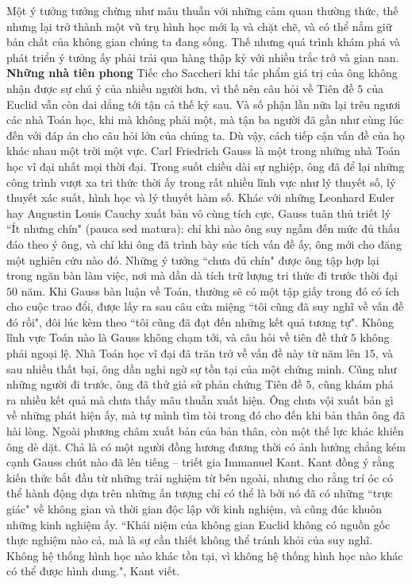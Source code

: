 \begin{multicols}{2}
	Một ý tưởng tưởng chừng như mâu thuẫn với những cảm quan thường thức, thế nhưng lại trở thành một vũ trụ hình học mới lạ và chặt chẽ, và có thể nắm giữ bản chất của không gian chúng ta đang sống. Thế nhưng quá trình khám phá và phát triển ý tưởng ấy phải trải qua hàng thập kỷ với nhiều trắc trở và gian nan.
	\vskip 0.1cm
	\textbf{\color{lichsutoanhoc}Những nhà tiên phong}
	\vskip 0.1cm
	Tiếc cho Saccheri khi tác phẩm giá trị của ông không nhận được sự chú ý của nhiều người hơn, vì thế nên câu hỏi về Tiên đề $5$ của Euclid vẫn còn dai dẳng tới tận cả thế kỷ sau. Và số phận lần nữa lại trêu ngươi các nhà Toán học, khi mà không phải một, mà tận ba người đã gần như cùng lúc đến với đáp án cho câu hỏi lớn của chúng ta. Dù vậy, cách tiếp cận vấn đề của họ khác nhau một trời một vực.
	\vskip 0.1cm
	Carl Friedrich Gauss là một trong những nhà Toán học vĩ đại nhất mọi thời đại. Trong suốt chiều dài sự nghiệp, ông đã để lại những công trình vượt xa tri thức thời ấy trong rất nhiều lĩnh vực như lý thuyết số, lý thuyết xác suất, hình học và lý thuyết hàm số. Khác với những Leonhard Euler hay Augustin Louis Cauchy xuất bản vô cùng tích cực, Gauss tuân thủ triết lý ``Ít nhưng chín" (pauca sed matura): chỉ khi nào ông suy ngẫm đến mức đủ thấu đáo theo ý ông, và chỉ khi ông đã trình bày súc tích vấn đề ấy, ông mới cho đăng một nghiên cứu nào đó. Những ý tưởng ``chưa đủ chín" được ông tập hợp lại trong ngăn bàn làm việc, nơi mà dần dà tích trữ lượng tri thức đi trước thời đại $50$ năm. Khi Gauss bàn luận về Toán, thường sẽ có một tập giấy trong đó có ích cho cuộc trao đổi, được lấy ra sau câu cửa miệng ``tôi cũng đã suy nghĩ về vấn đề đó rồi", đôi lúc kèm theo ``tôi cũng đã đạt đến những kết quả tương tự".
	\vskip 0.1cm
	Không lĩnh vực Toán nào là Gauss không chạm tới, và câu hỏi về tiên đề thứ $5$ không phải ngoại lệ. Nhà Toán học vĩ đại đã trăn trở về vấn đề này từ năm lên $15$, và sau nhiều thất bại, ông dần nghi ngờ sự tồn tại của một chứng minh. Cũng như những người đi trước, ông đã thử giả sử phản chứng Tiên đề $5$, cũng khám phá ra nhiều kết quả mà chưa thấy mâu thuẫn xuất hiện. Ông chưa vội xuất bản gì về những phát hiện ấy, mà tự mình tìm tòi trong đó cho đến khi bản thân ông đã hài lòng. Ngoài phương châm xuất bản của bản thân, còn một thế lực khác khiến ông dè dặt. Chả là có một người đồng hương đương thời có ảnh hưởng chẳng kém cạnh Gauss chút nào đã lên tiếng -- triết gia Immanuel Kant. Kant đồng ý rằng kiến thức bắt đầu từ những trải nghiệm từ bên ngoài, nhưng cho rằng trí óc có thể hành động dựa trên những ấn tượng chỉ có thể là bởi nó đã có những ``trực giác" về không gian và thời gian độc lập với kinh nghiệm, và cũng đúc khuôn những kinh nghiệm ấy. ``Khái niệm của không gian Euclid không có nguồn gốc thực nghiệm nào cả, mà là sự cần thiết không thể tránh khỏi của suy nghĩ. Không hệ thống hình học nào khác tồn tại, vì không hệ thống hình học nào khác có thể được hình dung.", Kant viết.

\end{multicols}
